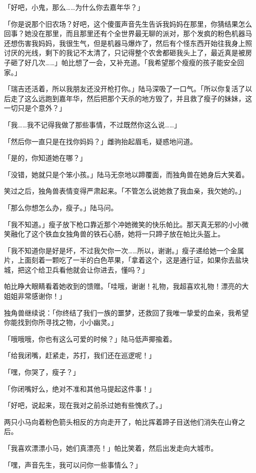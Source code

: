 「好吧，小鬼，那么……为什么你去嘉年华？」

「你是说那个旧农场？好吧，这个傻蛋声音先生告诉我妈妈在那里，你猜结果怎么回事？她没在那里，而且那里还有个全世界最无聊的派对，那个发疯的粉色机器马还想伤害我妈妈，我很生气，但是机器马爆炸了，然后有个怪东西开始往我身上照讨厌的光线，剩下的我记不太清了，只记得整个农舍都砸我头上了，最近真是被房子砸了好几次……」帕比想了一会，又补充道。「我希望那个瘦瘦的孩子能安全回家。」

「瑞吉还活着，所以我朋友还没开枪打你。」陆马深吸了一口气。「所以你复活了以后走了这么远跑到嘉年华，然后把那个天杀的地方毁了，并且救了瘦子的妹妹，这一切只是个意外？」

「我……我不记得我做了那些事情，不过既然你这么说……」

「然后你一直只是在找你妈妈？」雌驹抬起眉毛，疑惑地问道。

「是的，你知道她在哪？」

「没错，她就只是个笨小孩。」陆马无奈地以蹄覆面，而独角兽在她身后大笑着。

笑过之后，独角兽表情变得严肃起来。「不管怎么说她救了我血亲，我欠她的。」

「那么你想怎么办，瘦子。」陆马问。

「我不知道。」瘦子放下枪口靠近那个冲她微笑的快乐帕比。那天真无邪的小小微笑融化了这个铁血女独角兽的铁石心肠，她将一只蹄子放在帕比头盔上。

「我不知道你是好是坏，不过我欠你一次……所以，谢谢。」瘦子递给她一个金属片，上面刻着一颗吃了一半的白色苹果，「拿着这个，这是通行证，如果你去盐块城，把这个给卫兵看他就会让你进去，懂吗？」

帕比睁大眼睛看着她收到的馈赠。「哇哦，谢谢！礼物，我超喜欢礼物！漂亮的大姐姐非常感谢你！」

独角兽继续说：「你终结了我们一族的噩梦，还救回了我唯一挚爱的血亲，我希望你能找到你所寻找之物，小小幽灵。」

「哦哦哦，你也有这么可爱的时候？」陆马低声揶揄着。

「给我闭嘴，赶紧走，苏打，我们还在巡逻呢！」

「嘿，你哭了，瘦子？」

「你闭嘴好么，绝对不准和其他马提起这件事！」

「好吧，说起来，现在我对之前杀过她有些愧疚了。」

两只小马向着粉色箭头相反的方向走开了，帕比挥着蹄子目送他们消失在山脊之后。

「我喜欢漂漂小马，她们真漂亮！」帕比笑着，然后出发走向大城市。

「嘿，声音先生，我可以问你一些事情么？」

